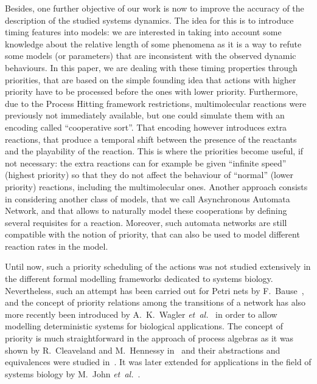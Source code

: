 Besides, one further objective of our work is now %
to improve the accuracy of the description of the studied systems dynamics.
The idea for this is to introduce timing features into models:
we are interested in taking into account some knowledge about the relative length of some phenomena as it is a way to refute some models (or parameters) that are inconsistent with the observed dynamic behaviours.
In this paper, we are dealing with these timing properties through priorities,
that are based on the simple founding idea that actions with higher priority have to be processed before the ones with lower priority.
Furthermore, due to the Process Hitting framework restrictions, multimolecular reactions were previously not immediately available, but one could simulate them with an encoding called “cooperative sort”.
That encoding however introduces extra reactions,
that produce a temporal shift between the presence of the reactants
and the playability of the reaction.
This is where the priorities become useful, if not necessary:
the extra reactions can for example be given “infinite speed” (highest priority) so that they do not affect the behaviour of “normal” (lower priority) reactions, including the multimolecular ones.
Another approach consists in considering another class of models,
that we call Asynchronous Automata Network,
and that allows to naturally model these cooperations
by defining several requisites for a reaction.
Moreover, such automata networks are still compatible with the notion of priority,
that can also be used to model different reaction rates in the model.

Until now, such a priority scheduling of the actions was not studied extensively in the different formal modelling frameworks dedicated to systems biology.
Nevertheless, such an attempt has been carried out for Petri nets by F.~Bause~\cite{Bause97},
and the concept of priority relations among the transitions of a network has also more recently been introduced by A.~K.~Wagler \textit{et~al.}~\cite{waw,WaglerW12} in order to allow modelling deterministic systems for biological applications.
The concept of priority is much straightforward in the approach of process algebras as it was shown by R.~Cleaveland and M.~Hennessy in~\cite{Cleaveland199058,Cleaveland99prioritiesin} and their abstractions and equivalences were studied in~\cite{Cleaveland:2007:PAP:1282576.1282847}.
It was later extended for applications in the field of systems biology by M.~John \textit{et~al.}~\cite{jlnu2010}.

